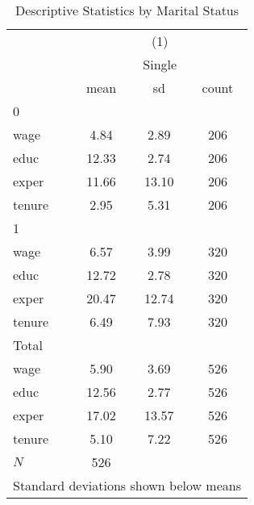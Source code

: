 \begin{table}[htbp]\centering
\def\sym#1{\ifmmode^{#1}\else\(^{#1}\)\fi}
\caption{Descriptive Statistics by Marital Status}\label{tab:0201-descriptives_by_marital}
\begin{tabular}{l*{1}{ccc}}
\toprule
            &\multicolumn{3}{c}{(1)}               \\
            &\multicolumn{3}{c}{Single}            \\
            &        mean&          sd&       count\\
\midrule
0           &            &            &            \\
wage        &        4.84&        2.89&         206\\
educ        &       12.33&        2.74&         206\\
exper       &       11.66&       13.10&         206\\
tenure      &        2.95&        5.31&         206\\
\midrule
1           &            &            &            \\
wage        &        6.57&        3.99&         320\\
educ        &       12.72&        2.78&         320\\
exper       &       20.47&       12.74&         320\\
tenure      &        6.49&        7.93&         320\\
\midrule
Total       &            &            &            \\
wage        &        5.90&        3.69&         526\\
educ        &       12.56&        2.77&         526\\
exper       &       17.02&       13.57&         526\\
tenure      &        5.10&        7.22&         526\\
\midrule
\(N\)       &         526&            &            \\
\bottomrule
\multicolumn{4}{l}{\footnotesize Standard deviations shown below means}\\
\end{tabular}
\end{table}

